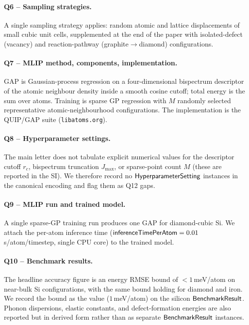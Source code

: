 \paragraph{Q6 -- Sampling strategies.}
A single sampling strategy applies: random atomic and lattice
displacements of small cubic unit cells, supplemented at the end of
the paper with isolated-defect (vacancy) and reaction-pathway
(graphite$\to$diamond) configurations.


\paragraph{Q7 -- MLIP method, components, implementation.}
GAP is Gaussian-process regression on a four-dimensional
bispectrum descriptor of the atomic neighbour density inside a
smooth cosine cutoff; total energy is the sum over atoms.
Training is sparse GP regression with $M$ randomly selected
representative atomic-neighbourhood configurations. The
implementation is the QUIP/GAP suite (\texttt{libatoms.org}).


\paragraph{Q8 -- Hyperparameter settings.}
The main letter does not tabulate explicit numerical values for the
descriptor cutoff $r_c$, bispectrum truncation $J_{\max}$, or
sparse-point count $M$ (these are reported in the SI). We
therefore record no $\mathsf{HyperparameterSetting}$ instances in the
canonical encoding and flag them as Q12 gaps.


\paragraph{Q9 -- MLIP run and trained model.}
A single sparse-GP training run produces one GAP for diamond-cubic
Si. We attach the per-atom inference time
($\mathsf{inferenceTimePerAtom}=0.01$\,s/atom/timestep, single CPU
core) to the trained model.


\paragraph{Q10 -- Benchmark results.}
The headline accuracy figure is an energy RMSE bound of
$<1$\,meV/atom on near-bulk Si configurations, with the same bound
holding for diamond and iron. We record the bound as the value
($1$\,meV/atom) on the silicon $\mathsf{BenchmarkResult}$. Phonon
dispersions, elastic constants, and defect-formation energies are
also reported but in derived form rather than as separate
$\mathsf{BenchmarkResult}$ instances.



